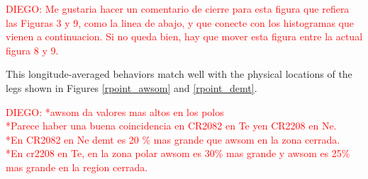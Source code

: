 \documentclass[namedreferences]{solarphysics}
\def\diego#1{\textcolor{red}{DIEGO: #1}}
\begin{document}
\begin{article}
\diego{Me gustaria hacer un comentario de cierre para esta figura que refiera las Figuras 3 y 9, como la linea de abajo, y que conecte con los histogramas que vienen a continuacion. Si no queda bien, hay que mover esta figura entre la actual figura 8 y 9.}

This longitude-averaged behaviors match well with the physical locations of the legs shown in Figures \ref{rpoint_awsom} and \ref{rpoint_demt}.

\diego{
*awsom da valores mas altos en los polos\\
*Parece haber una buena coincidencia en CR2082 en Te yen CR2208 en Ne.\\
*En CR2082 en Ne demt es 20 \% mas grande que awsom en la zona cerrada.\\
*En cr2208 en Te, en la zona polar awsom es 30\% mas grande y awsom es 25\% mas grande en la region cerrada.
}


\end{article}
\end{document}
